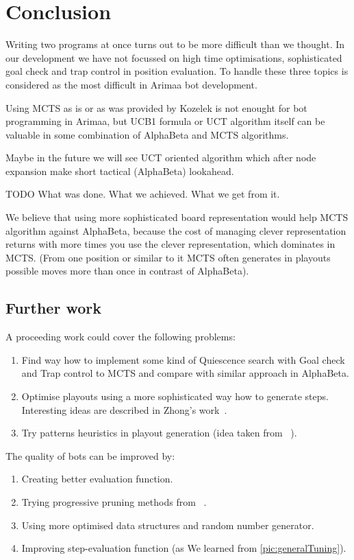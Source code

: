 \chapter{Conclusion}
Writing two programs at once turns out to be more difficult than we thought. In
our development we have not focussed on high time optimisations,
sophisticated goal check and trap control in position evaluation. To handle these three topics is considered as the most difficult in Arimaa bot development.

Using MCTS as is or as was provided by Kozelek is not enought for bot
programming in Arimaa, but UCB1 formula or UCT algorithm itself can be valuable
in some combination of AlphaBeta and MCTS algorithms.

Maybe in the future we will see UCT oriented algorithm which after node expansion make short tactical (AlphaBeta) lookahead.

TODO What was done. What we achieved. What we get from it.

We believe that using more sophisticated board representation would help MCTS
algorithm against AlphaBeta, because the cost of managing clever representation
returns with more times you use the clever representation, which dominates in
MCTS. (From one position or similar to it MCTS often generates in playouts
possible moves more than once in contrast of AlphaBeta).


\section{Further work}

A proceeding work could cover the following problems:

\begin{enumerate}
\item Find way how to implement some kind of Quiescence search with Goal check and Trap control to MCTS and compare with similar approach in AlphaBeta.
\item Optimise playouts using a more sophisticated way how to generate steps. Interesting ideas are described in Zhong's work~\cite{ZHONG}.
\item Try patterns heuristics in playout generation (idea taken from ~\cite{PatternsGo,PatternsArimaa}).
\end{enumerate}

\noindent The quality of bots can be improved by:
\begin{enumerate}
\item Creating better evaluation function.
\item Trying progressive pruning methods from ~\cite{progressive-strategies,
MonteCarloGo}.
\item Using more optimised data structures and random number generator.
\item Improving step-evaluation function (as We learned from \ref{pic:generalTuning}).
\end{enumerate}

